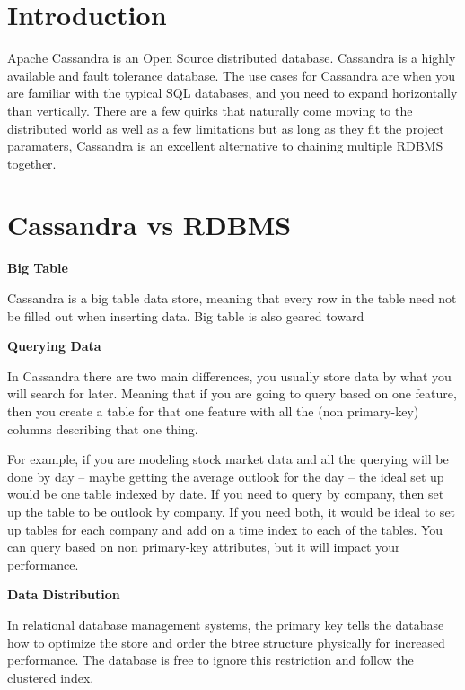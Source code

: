 \documentclass[9pt,twocolumn,twoside]{idsi}
\begin{document}
\makecoverpage

\maketitle

\section{Introduction}

Apache Cassandra is an Open Source distributed database. Cassandra is a highly available and fault tolerance database. The use cases for Cassandra are when you are familiar with the typical SQL databases, and you need to expand horizontally than vertically. There are a few quirks that naturally come moving to the distributed world as well as a few limitations but as long as they fit the project paramaters, Cassandra is an excellent alternative to chaining multiple RDBMS together.

\section{Cassandra vs RDBMS}

\textbf{Big Table}

Cassandra is a big table data store, meaning that every row in the table need not be filled out when inserting data. Big table is also geared toward

\textbf{Querying Data}

In Cassandra there are two main differences, you usually store data by what you will search for later. Meaning that if you are going to query based on one feature, then you create a table for that one feature with all the (non primary-key) columns describing that one thing.

For example, if you are modeling stock market data and all the querying will be done by day -- maybe getting the average outlook for the day -- the ideal set up would be one table indexed by date. If you need to query by company, then set up the table to be outlook by company. If you need both, it would be ideal to set up tables for each company and add on a time index to each of the tables. You can query based on non primary-key attributes, but it will impact your performance.

\textbf{Data Distribution}

In relational database management systems, the primary key tells the database how to optimize the store and order the btree structure physically for increased performance. The database is free to ignore this restriction and follow the clustered index.
\end{document}
